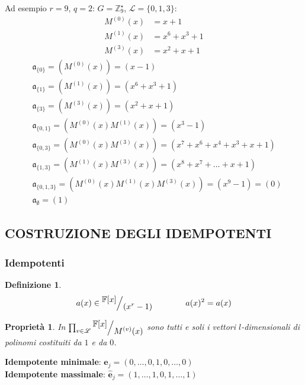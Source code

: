 \documentclass[mathserif]{beamer}
\def\quotient#1#2{%
   \raise1ex\hbox{$#1$}\Big/\lower1ex\hbox{$#2$}%
}
\newtheorem{definizione}{Definizione}
\newtheorem{prop}{Proprietà}
\begin{document}
\thispagestyle{empty}
\begin{frame}
   \vspace{-1.3cm}
     Ad esempio $r = 9$, $q = 2$: $ G = \mathbb{Z}_{9}^{\star} $, $\mathscr{L} = \lbrace 0,1,3 \rbrace$:
      \begin{align*}
	  M^{(0)}(x) &= x+1 \\
	  M^{(1)}(x) &= x^6+x^3+1 \\ 
	  M^{(3)}(x) &= x^2+x+1 
      \end{align*}
      \begin{align*}
	  &\mathfrak{a}_{\lbrace 0 \rbrace} = (M^{(0)}(x)) = (x-1) \\
	  &\mathfrak{a}_{\lbrace 1 \rbrace} = (M^{(1)}(x)) = (x^6+x^3+1) \\
	  &\mathfrak{a}_{\lbrace 3 \rbrace} = (M^{(3)}(x)) = (x^2+x+1) \\
	  &\mathfrak{a}_{\lbrace 0,1 \rbrace} = (M^{(0)}(x)M^{(1)}(x)) = (x^3 -1) \\
	  &\mathfrak{a}_{\lbrace 0,3 \rbrace} = (M^{(0)}(x)M^{(3)}(x)) = (x^7 + x^6 + x^4 + x^3 + x + 1) \\
	  &\mathfrak{a}_{\lbrace 1,3 \rbrace} 
			= (M^{(1)}(x)M^{(3)}(x)) = (x^8 + x^7 + \dots + x + 1) \\
	  &\mathfrak{a}_{\lbrace 0,1,3 \rbrace} = (M^{(0)}(x)M^{(1)}(x)M^{(3)}(x)) = (x^9 -1) = (0) \\
	  &\mathfrak{a}_{\emptyset} = (1) 
      \end{align*}
\end{frame}


\subsection{COSTRUZIONE DEGLI IDEMPOTENTI}
\begin{frame}
  \frametitle{Idempotenti}
  \begin{definizione}
     $ $  %
     \begin{align*}
        a(x) \in \quotient{\mathbb{F} \lbrack x \rbrack  }{ (x^{r} - 1)} \qquad \qquad a(x)^2 = a(x)
     \end{align*}
  \end{definizione}
  \pause
    \begin{prop}
      In $\prod_{v\in \mathscr{L}} \quotient{\mathbb{F} \lbrack x \rbrack  }{M^{(v)}(x)}$ 
      sono tutti e soli i vettori $l$-dimensionali di polinomi costituiti da $1$ e da $0$.
    \end{prop}
    {\bf Idempotente minimale}: $  \mathbf{e}_{j} = (0, \dots, 0,1,0, \dots, 0)$ \\
    {\bf Idempotente massimale}: $  \mathbf{\hat{e}}_{j} = (1, \dots, 1,0,1, \dots, 1)$ 
\end{frame}
\end{document}
